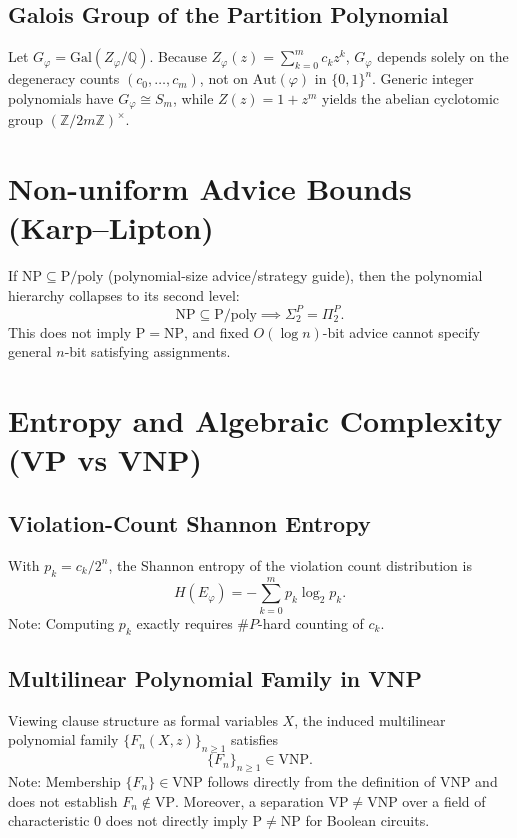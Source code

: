 \documentclass[11pt]{article}
\begin{document}
\subsection{Galois Group of the Partition Polynomial}
Let $G_\varphi = \mathrm{Gal}(Z_\varphi / \mathbb{Q})$. Because $Z_\varphi(z) = \sum_{k=0}^m c_k z^k$, $G_\varphi$ depends solely on the degeneracy counts $(c_0, \dots, c_m)$, not on $\mathrm{Aut}(\varphi)$ in $\{0,1\}^n$. Generic integer polynomials have $G_\varphi \cong S_m$, while $Z(z) = 1 + z^m$ yields the abelian cyclotomic group $(\mathbb{Z}/2m\mathbb{Z})^\times$.

\section{Non-uniform Advice Bounds (Karp--Lipton)}
If $\mathrm{NP} \subseteq \mathrm{P}/\mathrm{poly}$ (polynomial-size advice/strategy guide), then the polynomial hierarchy collapses to its second level:
\begin{equation}
\mathrm{NP} \subseteq \mathrm{P}/\mathrm{poly} \implies \Sigma_2^P = \Pi_2^P.
\end{equation}
This does not imply $\mathrm{P} = \mathrm{NP}$, and fixed $O(\log n)$-bit advice cannot specify general $n$-bit satisfying assignments.

\section{Entropy and Algebraic Complexity (VP vs VNP)}
\subsection{Violation-Count Shannon Entropy}
With $p_k = c_k / 2^n$, the Shannon entropy of the violation count distribution is
\begin{equation}
H(E_\varphi) = -\sum_{k=0}^{m} p_k \log_2 p_k.
\end{equation}
Note: Computing $p_k$ exactly requires $\#P$-hard counting of $c_k$.

\subsection{Multilinear Polynomial Family in VNP}
Viewing clause structure as formal variables $X$, the induced multilinear polynomial family $\{F_n(X, z)\}_{n \ge 1}$ satisfies
\begin{equation}
\{F_n\}_{n \ge 1} \in \mathrm{VNP}.
\end{equation}
Note: Membership $\{F_n\} \in \mathrm{VNP}$ follows directly from the definition of $\mathrm{VNP}$ and does not establish $F_n \notin \mathrm{VP}$. Moreover, a separation $\mathrm{VP} \neq \mathrm{VNP}$ over a field of characteristic $0$ does not directly imply $\mathrm{P} \neq \mathrm{NP}$ for Boolean circuits.
\end{document}

